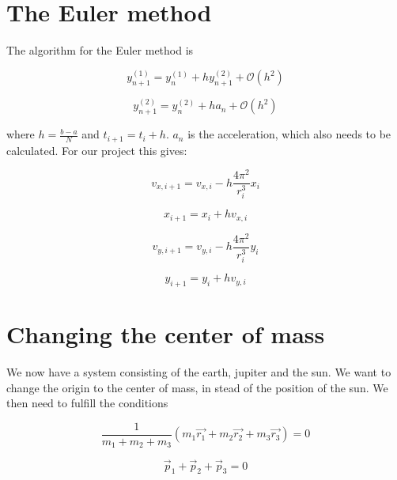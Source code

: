 \documentclass[11pt]{article}
\begin{document}
\section{The Euler method}

\begin{flushleft}
The algorithm for the Euler method is

\begin{equation}
y^{(1)}_{n+1} = y_n^{(1)} + hy_{n+1}^{(2)} + \mathcal{O}(h^2) 
\end{equation}

\begin{equation}
y^{(2)}_{n+1} = y^{(2)}_n +ha_n + \mathcal{O}(h^2)
\end{equation}


where $h = \frac{b-a}{N}$ and $t_{i+1} = t_i + h$. $a_n$ is the acceleration, which also needs to be calculated. For our project this gives: 

\begin{equation}
v_{x,i+1} = v_{x,i} - h \frac{4 \pi^2}{r_i^3} x_i
\end{equation}

\begin{equation}
x_{i+1} = x_i + hv_{x,i}
\end{equation}

\begin{equation}
v_{y,i+1} = v_{y,i} - h \frac{4 \pi^2}{r_i^3} y_i
\end{equation}

\begin{equation}
y_{i+1} = y_i + hv_{y,i}
\end{equation}
\end{flushleft}

\section{Changing the center of mass}

\begin{flushleft}
We now have a system consisting of the earth, jupiter and the sun. We want to change the origin to the center of mass, in stead of the position of the sun. We then need to fulfill the conditions

\begin{equation}
\frac{1}{m_1 + m_2 + m_3} (m_1 \vec{r_1} + m_2 \vec{r_2} + m_3 \vec{r_3}) = 0
\end{equation}

\begin{equation}
\vec{p}_1 + \vec{p}_2 + \vec{p}_3 = 0
\end{equation}
\end{flushleft}
\end{document}
